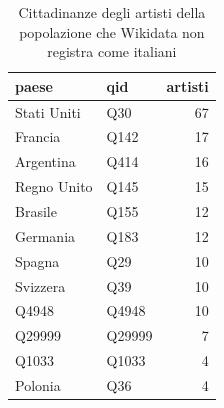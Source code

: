 \begin{table}
\centering
\caption{Cittadinanze degli artisti della popolazione che Wikidata non registra come italiani}
\label{tab:t1_validazione_falsi_positivi}
\begin{tabular}{llr}
\toprule
      paese &    qid &  artisti \\
\midrule
Stati Uniti &    Q30 &       67 \\
    Francia &   Q142 &       17 \\
  Argentina &   Q414 &       16 \\
Regno Unito &   Q145 &       15 \\
    Brasile &   Q155 &       12 \\
   Germania &   Q183 &       12 \\
     Spagna &    Q29 &       10 \\
   Svizzera &    Q39 &       10 \\
      Q4948 &  Q4948 &       10 \\
     Q29999 & Q29999 &        7 \\
      Q1033 &  Q1033 &        4 \\
    Polonia &    Q36 &        4 \\
\bottomrule
\end{tabular}
\end{table}
